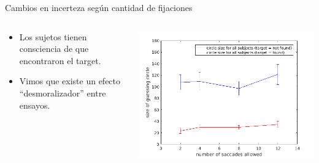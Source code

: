 \documentclass[compress]{beamer}
\begin{document}



\begin{frame}{Cambios en incerteza según cantidad de fijaciones}
\centering
  \begin{columns}[T]
    \begin{column}{.4\textwidth}
        \vspace{1.3cm}
        \begin{itemize}
        \item Los sujetos tienen consciencia de que encontraron el target.
        \item Vimos que existe un efecto ``desmoralizador'' entre ensayos.
        \end{itemize}
    \end{column}
    \begin{column}{.6\textwidth}
        \begin{center}
        \centering
        \includegraphics[width=\linewidth]{images/mean_circle_size.png}
        \end{center}
    \end{column}
  \end{columns}
\end{frame}
\end{document}
